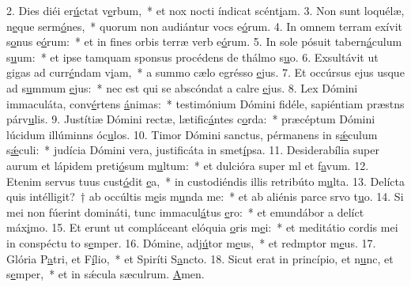 2. Dies diéi er\uline{ú}ctat v\uline{e}rbum,~* et nox nocti índicat scént\uline{i}am.
3. Non sunt loquélæ, n\uline{e}que serm\uline{ó}nes,~* quorum non audiántur vocs e\uline{ó}rum.
4. In omnem terram exívit s\uline{o}nus e\uline{ó}rum:~* et in fines orbis terræ verb e\uline{ó}rum.
5. In sole pósuit tabern\uline{á}culum s\uline{u}um:~* et ipse tamquam sponsus procédens de thálmo s\uline{u}o.
6. Exsultávit ut gigas ad curr\uline{é}ndam v\uline{i}am,~* a summo cælo egrésso \uline{e}jus.
7. Et occúrsus ejus usque ad s\uline{u}mmum \uline{e}jus:~* nec est qui se abscóndat a calre \uline{e}jus.
8. Lex Dómini immaculáta, conv\uline{é}rtens \uline{á}nimas:~* testimónium Dómini fidéle, sapiéntiam præstns párv\uline{u}lis.
9. Justítiæ Dómini rectæ, lætific\uline{á}ntes c\uline{o}rda:~* præcéptum Dómini lúcidum illúminns óc\uline{u}los.
10. Timor Dómini sanctus, pérmanens in s\uline{ǽ}culum s\uline{ǽ}culi:~* judícia Dómini vera, justificáta in smet\uline{í}psa.
11. Desiderabília super aurum et lápidem preti\uline{ó}sum m\uline{u}ltum:~* et dulcióra super ml et f\uline{a}vum.
12. Etenim servus tuus cust\uline{ó}dit \uline{e}a,~* in custodiéndis illis retribúto m\uline{u}lta.
13. Delícta quis intélligit?~† ab occúltis m\uline{e}is m\uline{u}nda me:~* et ab aliénis parce srvo t\uline{u}o.
14. Si mei non fúerint domináti, tunc immacul\uline{á}tus \uline{e}ro:~* et emundábor a delíct máx\uline{i}mo.
15. Et erunt ut compláceant elóquia \uline{o}ris m\uline{e}i:~* et meditátio cordis mei in conspéctu to s\uline{e}mper.
16. Dómine, adj\uline{ú}tor m\uline{e}us,~* et redmptor m\uline{e}us.
17. Glória P\uline{a}tri, et F\uline{í}lio,~* et Spiríti S\uline{a}ncto.
18. Sicut erat in princípio, et n\uline{u}nc, et s\uline{e}mper,~* et in sǽcula sæculrum. \uline{A}men.

